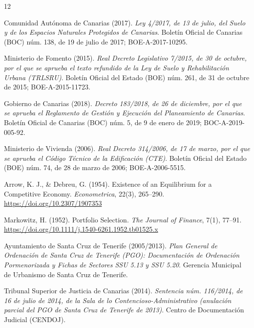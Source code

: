 \renewcommand{\refname}{Referencias Normativas, Técnicas y Jurisprudenciales}

\begin{thebibliography}{12}

Comunidad Autónoma de Canarias (2017).
\textit{Ley 4/2017, de 13 de julio, del Suelo y de los Espacios Naturales Protegidos de Canarias}.
Boletín Oficial de Canarias (BOC) núm. 138, de 19 de julio de 2017; BOE-A-2017-10295.

Ministerio de Fomento (2015).
\textit{Real Decreto Legislativo 7/2015, de 30 de octubre, por el que se aprueba el texto refundido de la Ley de Suelo y Rehabilitación Urbana (TRLSRU)}.
Boletín Oficial del Estado (BOE) núm. 261, de 31 de octubre de 2015; BOE-A-2015-11723.

Gobierno de Canarias (2018).
\textit{Decreto 183/2018, de 26 de diciembre, por el que se aprueba el Reglamento de Gestión y Ejecución del Planeamiento de Canarias}.
Boletín Oficial de Canarias (BOC) núm. 5, de 9 de enero de 2019; BOC-A-2019-005-92.

Ministerio de Vivienda (2006).
\textit{Real Decreto 314/2006, de 17 de marzo, por el que se aprueba el Código Técnico de la Edificación (CTE)}.
Boletín Oficial del Estado (BOE) núm. 74, de 28 de marzo de 2006; BOE-A-2006-5515.

Arrow, K. J., \& Debreu, G. (1954).
Existence of an Equilibrium for a Competitive Economy.
\textit{Econometrica}, 22(3), 265--290. \url{https://doi.org/10.2307/1907353}

Markowitz, H. (1952).
Portfolio Selection.
\textit{The Journal of Finance}, 7(1), 77--91. \url{https://doi.org/10.1111/j.1540-6261.1952.tb01525.x}

Ayuntamiento de Santa Cruz de Tenerife (2005/2013).
\textit{Plan General de Ordenación de Santa Cruz de Tenerife (PGO): Documentación de Ordenación Pormenorizada y Fichas de Sectores SSU 5.13 y SSU 5.20}.
Gerencia Municipal de Urbanismo de Santa Cruz de Tenerife.

Tribunal Superior de Justicia de Canarias (2014).
\textit{Sentencia núm. 116/2014, de 16 de julio de 2014, de la Sala de lo Contencioso-Administrativo (anulación parcial del PGO de Santa Cruz de Tenerife de 2013)}.
Centro de Documentación Judicial (CENDOJ).


\end{thebibliography}
